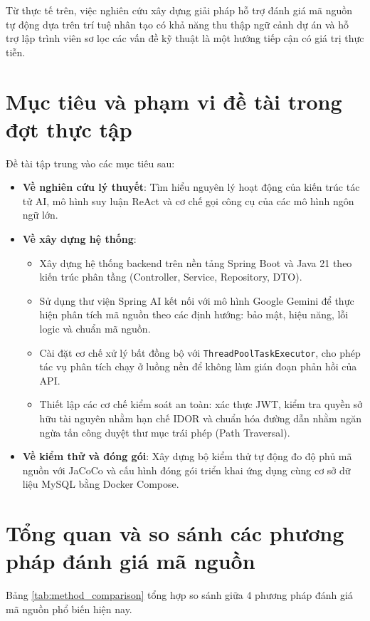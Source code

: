 \documentclass[12pt,a4paper]{report}
\begin{document}
Từ thực tế trên, việc nghiên cứu xây dựng giải pháp hỗ trợ đánh giá mã nguồn tự động dựa trên trí tuệ nhân tạo có khả năng thu thập ngữ cảnh dự án và hỗ trợ lập trình viên sơ lọc các vấn đề kỹ thuật là một hướng tiếp cận có giá trị thực tiễn.

\section{Mục tiêu và phạm vi đề tài trong đợt thực tập}
Đề tài tập trung vào các mục tiêu sau:
\begin{itemize}
    \item \textbf{Về nghiên cứu lý thuyết}: Tìm hiểu nguyên lý hoạt động của kiến trúc tác tử AI, mô hình suy luận ReAct và cơ chế gọi công cụ của các mô hình ngôn ngữ lớn.
    \item \textbf{Về xây dựng hệ thống}:
    \begin{itemize}
        \item Xây dựng hệ thống backend trên nền tảng Spring Boot và Java 21 theo kiến trúc phân tầng (Controller, Service, Repository, DTO).
        \item Sử dụng thư viện Spring AI kết nối với mô hình Google Gemini để thực hiện phân tích mã nguồn theo các định hướng: bảo mật, hiệu năng, lỗi logic và chuẩn mã nguồn.
        \item Cài đặt cơ chế xử lý bất đồng bộ với \texttt{ThreadPoolTaskExecutor}, cho phép tác vụ phân tích chạy ở luồng nền để không làm gián đoạn phản hồi của API.
        \item Thiết lập các cơ chế kiểm soát an toàn: xác thực JWT, kiểm tra quyền sở hữu tài nguyên nhằm hạn chế IDOR và chuẩn hóa đường dẫn nhằm ngăn ngừa tấn công duyệt thư mục trái phép (Path Traversal).
    \end{itemize}
    \item \textbf{Về kiểm thử và đóng gói}: Xây dựng bộ kiểm thử tự động đo độ phủ mã nguồn với JaCoCo và cấu hình đóng gói triển khai ứng dụng cùng cơ sở dữ liệu MySQL bằng Docker Compose.
\end{itemize}

\section{Tổng quan và so sánh các phương pháp đánh giá mã nguồn}
Bảng \ref{tab:method_comparison} tổng hợp so sánh giữa 4 phương pháp đánh giá mã nguồn phổ biến hiện nay.
\end{document}
